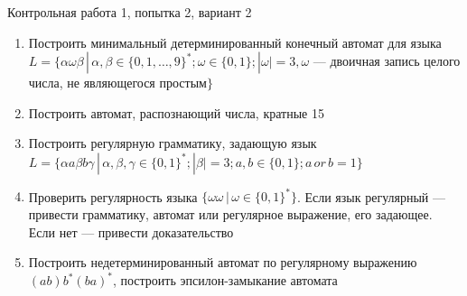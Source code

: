 \documentclass[12pt]{article}
\begin{document}

{\Large Контрольная работа 1, попытка 2, вариант 2}
\bigskip

\begin{enumerate}
  \item Построить минимальный детерминированный конечный автомат для языка \\ $L = \{ \alpha \omega \beta \, | \, \alpha, \beta \in \{ 0, 1, \dots, 9 \}^*; \omega \in \{ 0, 1 \}; |\omega| = 3, \omega$ --- двоичная запись целого числа, не являющегося простым$\}$
  \item { 
         Построить автомат, распознающий числа, кратные 15}
    \item Построить регулярную грамматику, задающую язык \\ $L = \{ \alpha a \beta b \gamma \, | \, \alpha, \beta, \gamma \in \{ 0, 1 \}^*; |\beta| = 3; a, b \in \{ 0, 1 \}; a \, or \, b = 1 \} $
    \item Проверить регулярность языка $\{ \omega \omega \, | \, \omega \in \{0, 1\}^* \}$. Если язык регулярный --- привести грамматику, автомат или регулярное выражение, его задающее. Если нет --- привести доказательство
    \item {Построить недетерминированный автомат по регулярному выражению $ (ab)b^*(ba)^*  $, построить эпсилон-замыкание автомата }
\end{enumerate}
\end{document}
